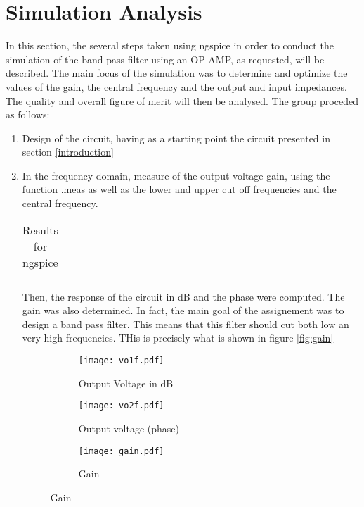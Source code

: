 \section{Simulation Analysis}
\label{section:sim}
 
In this section, the several steps taken using ngspice in order to conduct the simulation of the band pass filter using an OP-AMP, as requested, will be described. The main focus of the simulation was to determine and optimize the values of the gain, the central frequency and the output and input impedances. The quality and overall figure of merit will then be analysed.
The group proceded as follows:

\begin{enumerate}
\item Design of the circuit, having as a starting point the circuit presented in section \ref{introduction}

  
\item  In the frequency domain, measure of the output voltage gain, using the function .meas as well as the lower and upper cut off frequencies and the central frequency.


\begin{table}[ht]
  \centering
  \begin{tabular}{|l|r|}
    \hline    
   
    \end{tabular}
  \caption{Results for ngspice}
    \label{tab:results}
\end{table}


Then, the response of the circuit in dB and the phase were computed. The gain was also determined. In fact, the main goal of the assignement was to design a band pass filter. This means that this filter should cut both low an very high frequencies. THis is precisely what is shown in figure \ref{fig:gain}




\begin{figure}[ht]
\centering
\begin{subfigure}{.5\textwidth}
  \centering
  \texttt{[image: vo1f.pdf]}
  \caption{Output Voltage in dB}
  \label{fig:sim5}
\end{subfigure}%
\begin{subfigure}{.5\textwidth}
  \centering
  \texttt{[image: vo2f.pdf]}
  \caption{Output voltage (phase)}
  \label{fig:sim6}
  \end{subfigure}
  \begin{subfigure}{.5\textwidth}
  \centering
  \texttt{[image: gain.pdf]}
  \caption{Gain}
  \label{fig:sim6}


\end{subfigure}
\end{figure}
\end{enumerate}
